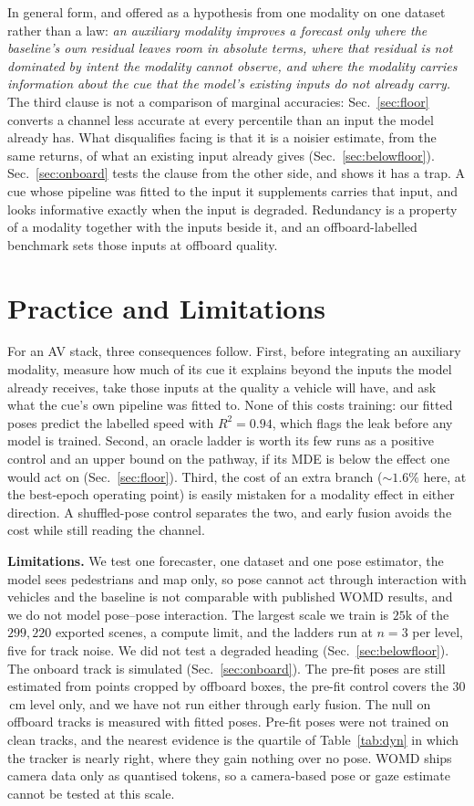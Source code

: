 \documentclass[conference]{IEEEtran}
\begin{document}
In general form, and offered as a hypothesis from one modality on one dataset
rather than a law: \emph{an auxiliary modality improves a forecast only where the
baseline's own residual leaves room in absolute terms, where that residual is not
dominated by intent the modality cannot observe, and where the modality carries
information about the cue that the model's existing inputs do not already carry.}
The third clause is not a comparison of marginal accuracies:
Sec.~\ref{sec:floor} converts a channel less accurate at every percentile than an
input the model already has. What disqualifies facing is that it is a noisier estimate, from the same
returns, of what an existing input already gives
(Sec.~\ref{sec:belowfloor}). Sec.~\ref{sec:onboard} tests the clause from the
other side, and shows it has a trap. A cue whose pipeline was fitted to the input
it supplements carries that input, and looks informative exactly when the input
is degraded. Redundancy is a property of a modality together with the inputs
beside it, and an offboard-labelled benchmark sets those inputs at offboard
quality.

\section{Practice and Limitations}
For an AV stack, three consequences follow. First, before integrating an
auxiliary modality, measure how much of its cue it explains beyond the
inputs the model already receives, take those inputs at the quality a vehicle
will have, and ask what the cue's own pipeline was fitted to. None of this costs
training: our fitted poses predict the labelled speed with $R^2{=}0.94$, which
flags the leak before any model is trained. Second, an oracle ladder is worth its few
runs as a positive control and an upper bound on the pathway, if its MDE is
below the effect one would act on (Sec.~\ref{sec:floor}). Third, the cost of an extra
branch (${\sim}1.6\%$ here, at the best-epoch operating point) is easily
mistaken for a modality effect in either direction. A shuffled-pose control
separates the two, and early fusion avoids the cost while still reading the
channel.

\textbf{Limitations.} We test one forecaster, one dataset and one pose
estimator, the model sees pedestrians and map only, so pose cannot act through
interaction with vehicles and the baseline is not comparable with published
WOMD results, and we do not model pose--pose interaction. The largest scale we train is $25$k of the $299{,}220$
exported scenes, a compute limit, and the ladders run at $n{=}3$ per level, five
for track noise. We did not test a degraded heading (Sec.~\ref{sec:belowfloor}). The onboard track is simulated
(Sec.~\ref{sec:onboard}). The pre-fit poses are still estimated from points cropped by
offboard boxes, the pre-fit control covers the $30$\,cm level only, and we have
not run either through early fusion. The null on offboard tracks is measured
with fitted poses. Pre-fit poses were not trained on clean tracks, and the
nearest evidence is the quartile of Table~\ref{tab:dyn} in which the tracker is
nearly right, where they gain nothing over no pose. WOMD ships camera data only as quantised tokens, so a
camera-based pose or gaze estimate cannot be tested at this scale.
\end{document}
